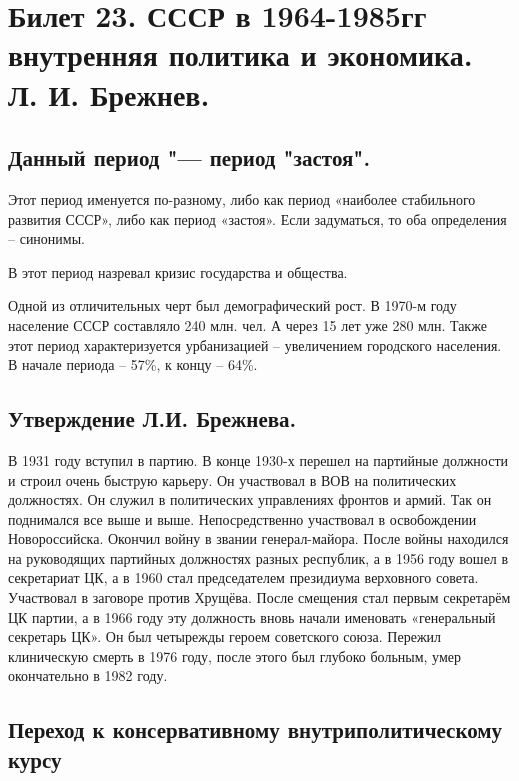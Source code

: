 \section{Билет 23. СССР в 1964-1985гг внутренняя политика и экономика. Л. И. Брежнев.}

\subsection{Данный период "--- период "застоя".}

Этот период именуется по-разному, либо как период «наиболее стабильного развития СССР», либо как период «застоя». Если задуматься, то оба определения – синонимы. 

В этот период назревал кризис государства и общества. 

Одной из отличительных черт был демографический рост. В 1970-м году население СССР составляло 240 млн. чел. А через 15 лет уже 280 млн. Также этот период характеризуется урбанизацией – увеличением городского населения. В начале периода – 57\%, к концу – 64\%.

\subsection{Утверждение Л.И. Брежнева.}

В 1931 году вступил в партию. В конце 1930-х перешел на партийные должности и строил очень быструю карьеру. Он участвовал в ВОВ на политических должностях. Он служил в политических управлениях фронтов и армий. Так он поднимался все выше и выше. Непосредственно участвовал в освобождении Новороссийска. Окончил войну в звании генерал-майора. После войны находился на руководящих партийных должностях разных республик, а в 1956 году вошел в секретариат ЦК, а в 1960 стал председателем президиума верховного совета. Участвовал в заговоре против Хрущёва. После смещения стал первым секретарём ЦК партии, а в 1966 году эту должность вновь начали именовать «генеральный секретарь ЦК». Он был четырежды героем советского союза. Пережил клиническую смерть в 1976 году, после этого был глубоко больным, умер окончательно в 1982 году. 

\subsection{Переход к консервативному внутриполитическому курсу}

